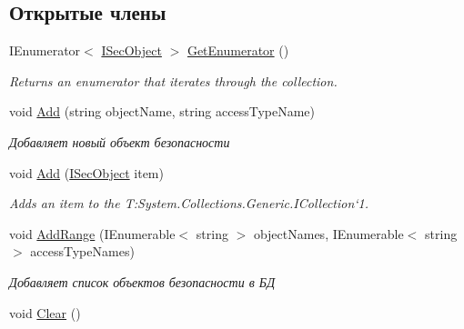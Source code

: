 \subsection*{Открытые члены}
\begin{DoxyCompactItemize}
\item 
I\+Enumerator$<$ \hyperlink{interface_security_1_1_interfaces_1_1_model_1_1_i_sec_object}{I\+Sec\+Object} $>$ \hyperlink{class_security_1_1_entity_framework_1_1_collections_1_1_sec_object_collection_ac4b5538f96293498e05e7c3a0c91ffcd}{Get\+Enumerator} ()
\begin{DoxyCompactList}\small\item\em Returns an enumerator that iterates through the collection. \end{DoxyCompactList}\item 
void \hyperlink{class_security_1_1_entity_framework_1_1_collections_1_1_sec_object_collection_a4a16dfa2ff30c3c55b8e16e90df074c2}{Add} (string object\+Name, string access\+Type\+Name)
\begin{DoxyCompactList}\small\item\em Добавляет новый объект безопасности \end{DoxyCompactList}\item 
void \hyperlink{class_security_1_1_entity_framework_1_1_collections_1_1_sec_object_collection_aebd8e660b48b1fbaf8b603a2ee67a030}{Add} (\hyperlink{interface_security_1_1_interfaces_1_1_model_1_1_i_sec_object}{I\+Sec\+Object} item)
\begin{DoxyCompactList}\small\item\em Adds an item to the T\+:\+System.\+Collections.\+Generic.\+I\+Collection`1. \end{DoxyCompactList}\item 
\mbox{\label{class_security_1_1_entity_framework_1_1_collections_1_1_sec_object_collection_a8947c78fa20e67345a737234a0558e41}} 
void \hyperlink{class_security_1_1_entity_framework_1_1_collections_1_1_sec_object_collection_a8947c78fa20e67345a737234a0558e41}{Add\+Range} (I\+Enumerable$<$ string $>$ object\+Names, I\+Enumerable$<$ string $>$ access\+Type\+Names)
\begin{DoxyCompactList}\small\item\em Добавляет список объектов безопасности в БД  \end{DoxyCompactList}\item 
void \hyperlink{class_security_1_1_entity_framework_1_1_collections_1_1_sec_object_collection_aad993fcd6d044decbbf3422293a87930}{Clear} ()

\end{DoxyCompactItemize}
